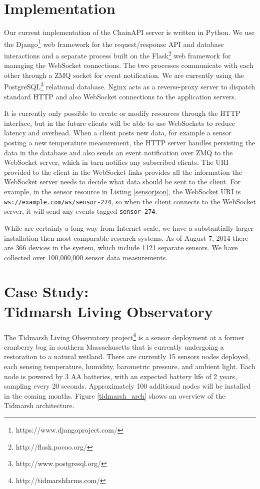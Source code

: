 \documentclass{acm_proc_article-sp}
\begin{document}
\section{Implementation}

Our current implementation of the ChainAPI server is written in Python. We use
the Django\footnote{https://www.djangoproject.com/} web framework for the
request/response API and database interactions and a separate process built on
the Flask\footnote{http://flask.pocoo.org/} web framework for managing the
WebSocket connections. The two processes communicate with each other through a
ZMQ socket for event notification. We are currently using the
PostgreSQL\footnote{http://www.postgresql.org/} relational database. Nginx acts
as a reverse-proxy server to dispatch standard HTTP and also WebSocket
connections to the application servers.

It is currently only possible to create or modify resources through the HTTP
interface, but in the future clients will be able to use WebSockets to reduce
latency and overhead. When a client posts new data, for example a sensor
posting a new temperature measurement, the HTTP server handles persisting the
data in the database and also sends an event notification over ZMQ to the
WebSocket server, which in turn notifies any subscribed clients. The URI
provided to the client in the WebSocket links provides all the information the
WebSocket server needs to decide what data should be sent to the client. For
example, in the sensor resource in Listing \ref{sensorjson}, the WebSocket URI
is \texttt{ws://example.com/ws/sensor-274}, so when the client connects to the
WebSocket server, it will send any events tagged \texttt{sensor-274}.

While are certainly a long way from Internet-scale, we have a substantially
larger installation then most comparable research systems. As of August 7, 2014
there are 366 devices in the system, which include 1121 separate sensors. We
have collected over 100,000,000 sensor data measurements.

\section{Case Study:\\Tidmarsh Living Observatory}

The Tidmarsh Living Observatory project\footnote{http://tidmarshfarms.com/} is
a sensor deployment at a former cranberry bog in southern Massachusetts that is
currently undergoing a restoration to a natural wetland. There are currently 15
sensors nodes deployed, each sensing temperature, humidity, barometric
pressure, and ambient light. Each node is powered by 3 AA batteries, with an
expected battery life of 2 years, sampling every 20 seconds. Approximately 100
additional nodes will be installed in the coming months. Figure
\ref{tidmarsh_arch} shows an overview of the Tidmarsh architecture.
\end{document}
